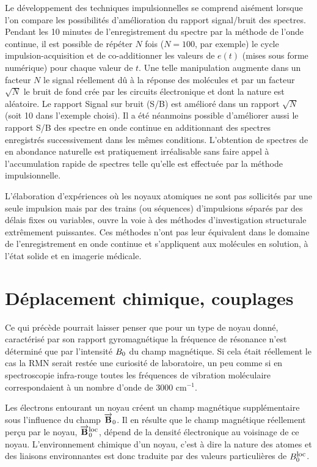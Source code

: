 Le développement des techniques impulsionnelles se comprend aisément lorsque
l'on compare les possibilités d'amélioration du rapport signal/bruit des spectres.
Pendant les 10 minutes de l'enregistrement du spectre par la méthode de l'onde
continue, il est possible de répéter $N$ fois ($N = 100$, par exemple) le cycle
impulsion-acquisition et de co-additionner les valeurs de $e(t)$
(mises sous forme numérique) pour chaque valeur de $t$.
Une telle manipulation augmente dans un facteur $N$ le signal réellement
dû à la réponse des molécules et par un facteur $\sqrt{N}$ le bruit de fond crée par
les circuits électronique et dont la nature est aléatoire.
Le rapport Signal sur bruit (S/B) est amélioré dans un rapport $\sqrt{N}$
(soit 10 dans l'exemple choisi).
Il a été néanmoins possible d'améliorer aussi le rapport S/B
des spectre en onde continue en additionnant des spectres enregistrés successivement
dans les mêmes conditions.
L'obtention de spectres de \carb en abondance naturelle est
pratiquement irréalisable sans faire appel à l'accumulation rapide de spectres telle
qu'elle est effectuée par la méthode impulsionnelle.

L'élaboration d'expériences où les noyaux atomiques ne sont pas sollicités par
une seule impulsion mais par des trains (ou séquences) d'impulsions séparés par des
délais fixes ou variables, ouvre la voie à des méthodes d'investigation structurale
extrêmement puissantes.
Ces méthodes n'ont pas leur équivalent dans le domaine de
l'enregistrement en onde continue et s'appliquent aux molécules en solution, à l'état
solide et en imagerie médicale.

\section{Déplacement chimique, couplages}
\label{sec:chemshift}
Ce qui précède pourrait laisser penser que pour un type de noyau donné,
caractérisé par son rapport gyromagnétique la fréquence de résonance n'est déterminé
que par l'intensité $B_0$ du champ magnétique.
Si cela était réellement le cas la RMN serait restée une curiosité de
laboratoire, un peu comme si en spectroscopie infra-rouge toutes les fréquences de
vibration moléculaire correspondaient à un nombre d'onde de 3000 cm$^{-1}$.

Les électrons entourant un noyau créent un champ magnétique supplémentaire
sous l'influence du champ $\overrightarrow{\mathbf{B}}_0$.
Il en résulte que le champ magnétique réellement perçu
par le noyau, $\overrightarrow{\mathbf{B}}_0^{\mbox{\footnotesize{loc}}}$, dépend de la densité électronique au
voisinage de ce noyau.
L'environnement chimique d'un noyau, c'est à dire la nature des atomes et des liaisons
environnantes est donc traduite par des valeurs particulières de
$B_0^{\mbox{\footnotesize{loc}}}$.

